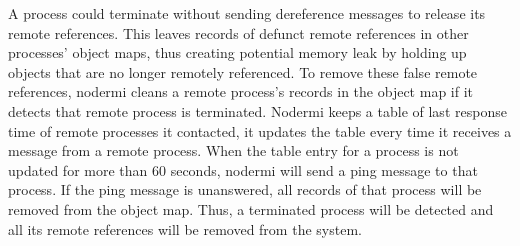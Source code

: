 A process could terminate without 
sending dereference messages to release its remote references.
This leaves records of defunct remote references
in other processes' object maps,
thus creating potential memory leak by holding up
objects that are no longer remotely referenced.
To remove these false remote references,
nodermi cleans a remote process's records in the object map if
it detects that remote process is terminated.
Nodermi keeps a table of last response time of remote processes it contacted,
it updates the table every time it receives a message from a remote process.
When the table entry for a process is not updated for more than 60 seconds, nodermi
will send a ping message to that process.
If the ping message is unanswered, all records of that process will be removed
from the object map.
Thus, a terminated process will be detected and all its remote references 
will be removed from the system.







